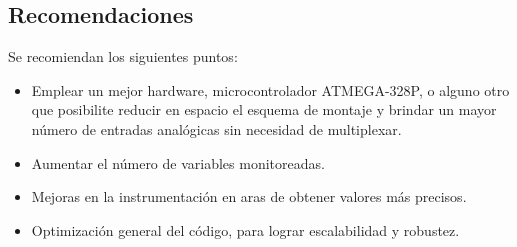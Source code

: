 \begin{center}
    \section*{\LARGE Recomendaciones}    
\end{center}

Se recomiendan los siguientes puntos:

\begin{itemize}
    \item Emplear un mejor hardware, microcontrolador ATMEGA-328P, o alguno otro que posibilite reducir en espacio el esquema de montaje y brindar un mayor número de entradas analógicas sin necesidad de multiplexar.
    \item Aumentar el número de variables monitoreadas.
    \item Mejoras en la instrumentación en aras de obtener valores más precisos.
    \item Optimización general del código, para lograr escalabilidad y robustez.
\end{itemize}